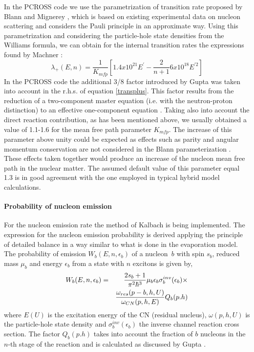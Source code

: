 In the PCROSS code we use the parametrization of transition rate proposed by
Blann and Mignerey \cite{Blann:72a}, which is based on existing experimental
data on nucleon scattering and considers the Pauli principle in an
approximate way. Using this parametrization and considering the
particle-hole state densities from the Williams formula, we can obtain for
the internal transition rates the expressions found by Machner \cite{Machner:81}:
\begin{equation}
\lambda _{+}(E,n)=\frac{1}{K_{mfp}}\left[ 1.4x10^{21}E^{\prime }-\frac{2}{n+1%
}6x10^{18}E^{\prime 2}\right]  \label{transplus}
\end{equation}%
In the PCROSS code the additional 3/8 factor introduced by Gupta \cite{Gupta:81}
was taken into account in the r.h.s. of equation \ref{transplus}. This
factor results from the reduction of a two-component master equation (i.e.
with the neutron-proton distinction) to an effective one-component equation
\cite{Gupta:81}. Taking also into account the direct reaction contribution, as
has been mentioned above, we usually obtained a value of 1.1-1.6 for the
mean free path parameter $K_{mfp}$. The increase of this parameter above
unity could be expected as effects such as parity and angular momentum
conservation are not considered in the Blann parameterization \cite{Blann:72a}.
These effects taken together would produce an increase of the nucleon mean
free path in the nuclear matter. The assumed default value of this parameter
equal 1.3 is in good agreement with the one employed in typical hybrid model
calculations.

\paragraph{Probability of nucleon emission}

For the nucleon emission rate the method of Kalbach \cite{Cline:71,Cline:72,Kalbach:77}
is being implemented. The expression for the nucleon emission probability is
derived applying the principle of detailed balance in a way similar to what
is done in the evaporation model. The probability of emission $%
W_{b}(E,n,\epsilon _{b})$ of a nucleon\textit{\ }$b$ with spin $s_{b}$,
reduced mass $\mu _{b}$ and energy $\epsilon _{b}$ from a state with $n$
excitons is given by,
\begin{eqnarray}
W_{b}(E,n,\epsilon _{b})&=&\frac{2s_{b}+1}{\pi ^{2}\hbar ^{3}}\mu _{b}\epsilon
_{b}\sigma _{b}^{inv}(\epsilon _{b})\times   \notag \\
&&\frac{\omega _{res}(p-b,h,U)}{\omega _{CN}(p,h,E)}Q_{b}(p.h)
\end{eqnarray}%
where $E(U)$ is the excitation energy of the CN (residual nucleus), $\omega
(p,h,U)$ is the particle-hole state density and $\sigma _{b}^{inv}(\epsilon
_{b})$ the inverse channel reaction cross section. The factor $Q_{b}(p.h)$
takes into account the fraction of $b$ nucleons in the $n$-th stage of the
reaction and is calculated as discussed by Gupta \cite{Gupta:81}.

